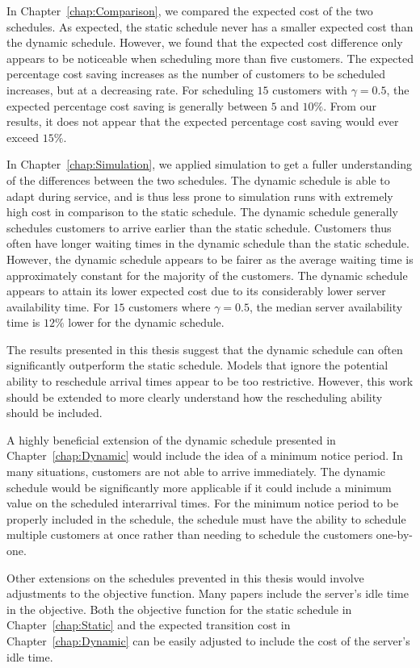 In Chapter~\ref{chap:Comparison}, we compared the expected cost of the two schedules. As expected, the static schedule never has a smaller expected cost than the dynamic schedule. However, we found that the expected cost difference only appears to be noticeable when scheduling more than five customers. The expected percentage cost saving increases as the number of customers to be scheduled increases, but at a decreasing rate. For scheduling $15$ customers with $\gamma = 0.5$, the expected percentage cost saving is generally between $5$ and $10\%$. From our results, it does not appear that the expected percentage cost saving would ever exceed $15\%$.

In Chapter~\ref{chap:Simulation}, we applied simulation to get a fuller understanding of the differences between the two schedules. The dynamic schedule is able to adapt during service, and is thus less prone to simulation runs with extremely high cost in comparison to the static schedule. The dynamic schedule generally schedules customers to arrive earlier than the static schedule. Customers thus often have longer waiting times in the dynamic schedule than the static schedule. However, the dynamic schedule appears to be fairer as the average waiting time is approximately constant for the majority of the customers. The dynamic schedule appears to attain its lower expected cost due to its considerably lower server availability time. For $15$ customers where $\gamma = 0.5$, the median server availability time is $12 \%$ lower for the dynamic schedule.

The results presented in this thesis suggest that the dynamic schedule can often significantly outperform the static schedule. Models that ignore the potential ability to reschedule arrival times appear to be too restrictive. However, this work should be extended to more clearly understand how the rescheduling ability should be included.

A highly beneficial extension of the dynamic schedule presented in Chapter~\ref{chap:Dynamic} would include the idea of a minimum notice period. In many situations, customers are not able to arrive immediately. The dynamic schedule would be significantly more applicable if it could include a minimum value on the scheduled interarrival times. For the minimum notice period to be properly included in the schedule, the schedule must have the ability to schedule multiple customers at once rather than needing to schedule the customers one-by-one.

Other extensions on the schedules prevented in this thesis would involve adjustments to the objective function. Many papers include the server's idle time in the objective. Both the objective function for the static schedule in Chapter~\ref{chap:Static} and the expected transition cost in Chapter~\ref{chap:Dynamic} can be easily adjusted to include the cost of the server's idle time.


